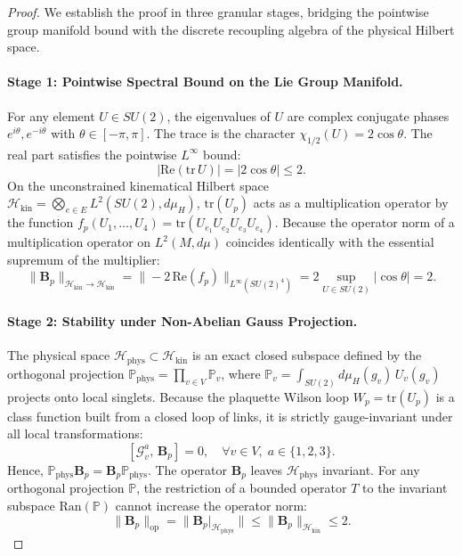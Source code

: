 \documentclass[11pt,reqno]{article}
\begin{document}
\begin{proof}
We establish the proof in three granular stages, bridging the pointwise group manifold bound with the discrete recoupling algebra of the physical Hilbert space.

\paragraph{Stage 1: Pointwise Spectral Bound on the Lie Group Manifold.}
For any element $U \in SU(2)$, the eigenvalues of $U$ are complex conjugate phases $e^{i\theta}, e^{-i\theta}$ with $\theta \in [-\pi, \pi]$. The trace is the character $\chi_{1/2}(U) = 2\cos\theta$.
The real part satisfies the pointwise $L^\infty$ bound:
\begin{equation}
    \label{eq:pointwise_trace_bound}
    |\mathrm{Re}(\mathrm{tr}\,U)| = |2\cos\theta| \le 2.
\end{equation}
On the unconstrained kinematical Hilbert space $\mathcal{H}_{\mathrm{kin}} = \bigotimes_{e \in E} L^2(SU(2), d\mu_H)$, $\mathrm{tr}(U_p)$ acts as a multiplication operator by the function $f_p(U_1, \dots, U_4) = \mathrm{tr}(U_{e_1} U_{e_2} U_{e_3} U_{e_4})$.
Because the operator norm of a multiplication operator on $L^2(M, d\mu)$ coincides identically with the essential supremum of the multiplier:
\begin{equation}
    \label{eq:kinematical_norm}
    \|\mathbf{B}_p\|_{\mathcal{H}_{\mathrm{kin}} \to \mathcal{H}_{\mathrm{kin}}} = \|-2\,\mathrm{Re}(f_p)\|_{L^\infty(SU(2)^4)} = 2 \sup_{U \in SU(2)} |\cos\theta| = 2.
\end{equation}

\paragraph{Stage 2: Stability under Non-Abelian Gauss Projection.}
The physical space $\mathcal{H}_{\mathrm{phys}} \subset \mathcal{H}_{\mathrm{kin}}$ is an exact closed subspace defined by the orthogonal projection $\mathbb{P}_{\mathrm{phys}} = \prod_{v \in V} \mathbb{P}_v$, where $\mathbb{P}_v = \int_{SU(2)} d\mu_H(g_v) \, U_v(g_v)$ projects onto local singlets.
Because the plaquette Wilson loop $W_p = \mathrm{tr}(U_p)$ is a class function built from a closed loop of links, it is strictly gauge-invariant under all local transformations:
\begin{equation}
    \label{eq:gauge_commutator}
    [\mathcal{G}_v^a, \, \mathbf{B}_p] = 0, \quad \forall v \in V, \; a \in \{1, 2, 3\}.
\end{equation}
Hence, $\mathbb{P}_{\mathrm{phys}} \mathbf{B}_p = \mathbf{B}_p \mathbb{P}_{\mathrm{phys}}$.
The operator $\mathbf{B}_p$ leaves $\mathcal{H}_{\mathrm{phys}}$ invariant.
For any orthogonal projection $\mathbb{P}$, the restriction of a bounded operator $T$ to the invariant subspace $\mathrm{Ran}(\mathbb{P})$ cannot increase the operator norm:
\begin{equation}
    \label{eq:restriction_norm}
    \|\mathbf{B}_p\|_{\mathrm{op}} = \|\mathbf{B}_p|_{\mathcal{H}_{\mathrm{phys}}}\| \le \|\mathbf{B}_p\|_{\mathcal{H}_{\mathrm{kin}}} \le 2.
\end{equation}


\end{proof}
\end{document}
